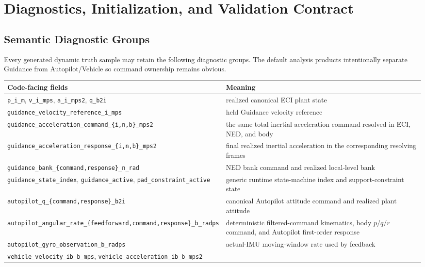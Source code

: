 \chapter{Diagnostics, Initialization, and Validation Contract}

\section{Semantic Diagnostic Groups}

Every generated dynamic truth sample may retain the following diagnostic
groups. The default analysis products intentionally separate Guidance from
Autopilot/Vehicle so command ownership remains obvious.

\begin{center}
\scriptsize
\begin{longtable}{p{}p{}}
\toprule
Code-facing fields & Meaning \\
\midrule
\endhead
\texttt{p\_i\_m}, \texttt{v\_i\_mps},
\texttt{a\_i\_mps2}, \texttt{q\_b2i}
& realized canonical ECI plant state \\
\texttt{guidance\_velocity\_reference\_i\_mps}
& held Guidance velocity reference \\
\texttt{guidance\_acceleration\_command\_\{i,n,b\}\_mps2}
& the same total inertial-acceleration command resolved in ECI, NED, and body \\
\texttt{guidance\_acceleration\_response\_\{i,n,b\}\_mps2}
& final realized inertial acceleration in the corresponding resolving frames \\
\texttt{guidance\_bank\_\{command,response\}\_n\_rad}
& NED bank command and realized local-level bank \\
\texttt{guidance\_state\_index}, \texttt{guidance\_active},
\texttt{pad\_constraint\_active}
& generic runtime state-machine index and support-constraint state \\
\texttt{autopilot\_q\_\{command,response\}\_b2i}
& canonical Autopilot attitude command and realized plant attitude \\
\texttt{autopilot\_angular\_rate\_\{feedforward,command,response\}\_b\_radps}
& deterministic filtered-command kinematics, body $p/q/r$ command, and
  Autopilot first-order response \\
\texttt{autopilot\_gyro\_observation\_b\_radps}
& actual-IMU moving-window rate used by feedback \\
\texttt{vehicle\_velocity\_ib\_b\_mps},
\texttt{vehicle\_acceleration\_ib\_b\_mps2}

\end{longtable}
\end{center}
